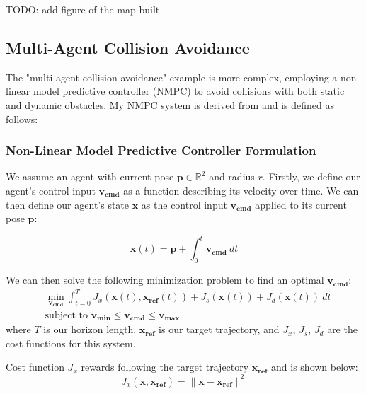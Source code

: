 TODO: add figure of the map built

\subsection{Multi-Agent Collision Avoidance}
\label{sec:multi-agent-collision-avoidance}
The "multi-agent collision avoidance" example is more complex, employing a non-linear model predictive controller (NMPC) to avoid collisions with both static and dynamic obstacles. My NMPC system is derived from \autocite{DBLP:journals/corr/KamelASN17} and is defined as follows:

\subsubsection{Non-Linear Model Predictive Controller Formulation}
\label{sec:nmpc-implementation-details}
We assume an agent with current pose $\bm{p} \in \mathbb{R}^2$ and radius $r$. Firstly, we define our agent's control input $\bm{v_{cmd}}$ as a function describing its velocity over time. We can then define our agent's state $\bm{x}$ as the control input $\bm{v_{cmd}}$ applied to its current pose $\bm{p}$:

\begin{equation}
    \bm{x}(t) = \bm{p} + \int_{0}^{t} \bm{v_{cmd}}\ dt
\end{equation}

We can then solve the following minimization problem to find an optimal $\bm{v_{cmd}}$:
\begin{equation}
    \begin{aligned} \label{eq:nmpc-minimization-problem}
         & \min_{\bm{v_{cmd}}} \int_{t=0}^{T} J_x(\bm{x}(t), \bm{x_{ref}}(t)) + J_s(\bm{x}(t)) + J_d(\bm{x}(t))\ dt \\
         & \text{subject to } \bm{v_{min}} \leq \bm{v_{cmd}} \leq \bm{v_{max}}
    \end{aligned}
\end{equation}
where $T$ is our horizon length, $\bm{x_{ref}}$ is our target trajectory, and $J_x$, $J_s$, $J_d$ are the cost functions for this system.

Cost function $J_x$ rewards following the target trajectory $\bm{x_{ref}}$ and is shown below:
\begin{equation}
    J_x(\bm{x}, \bm{x_{ref}}) = \|\bm{x} - \bm{x_{ref}}\|^2
\end{equation}

